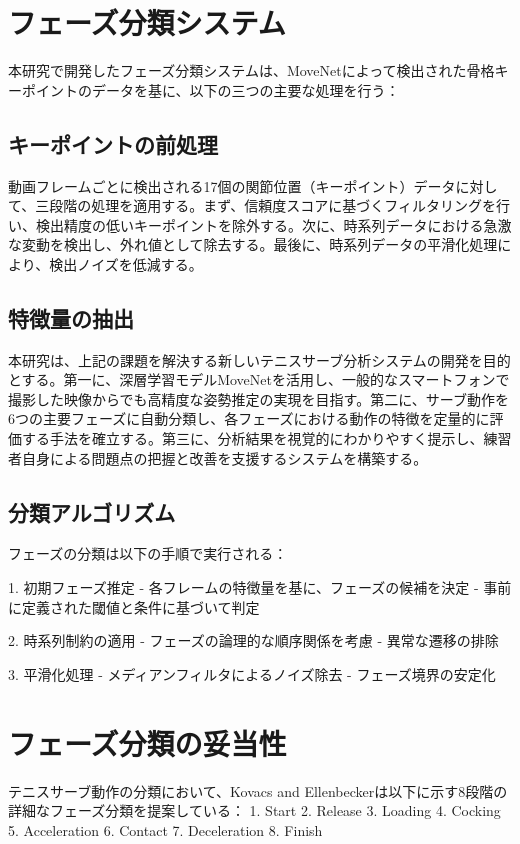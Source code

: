 \documentclass[oneside]{suribt}[11pt]
\begin{document}
\section{フェーズ分類システム}
本研究で開発したフェーズ分類システムは、MoveNetによって検出された骨格キーポイントのデータを基に、以下の三つの主要な処理を行う：

\subsection{キーポイントの前処理}
動画フレームごとに検出される17個の関節位置（キーポイント）データに対して、三段階の処理を適用する。まず、信頼度スコアに基づくフィルタリングを行い、検出精度の低いキーポイントを除外する。次に、時系列データにおける急激な変動を検出し、外れ値として除去する。最後に、時系列データの平滑化処理により、検出ノイズを低減する。

\subsection{特徴量の抽出}
本研究は、上記の課題を解決する新しいテニスサーブ分析システムの開発を目的とする。第一に、深層学習モデルMoveNetを活用し、一般的なスマートフォンで撮影した映像からでも高精度な姿勢推定の実現を目指す。第二に、サーブ動作を6つの主要フェーズに自動分類し、各フェーズにおける動作の特徴を定量的に評価する手法を確立する。第三に、分析結果を視覚的にわかりやすく提示し、練習者自身による問題点の把握と改善を支援するシステムを構築する。

\subsection{分類アルゴリズム}
フェーズの分類は以下の手順で実行される：

1. 初期フェーズ推定
   - 各フレームの特徴量を基に、フェーズの候補を決定
   - 事前に定義された閾値と条件に基づいて判定

2. 時系列制約の適用
   - フェーズの論理的な順序関係を考慮
   - 異常な遷移の排除

3. 平滑化処理
   - メディアンフィルタによるノイズ除去
   - フェーズ境界の安定化

\section{フェーズ分類の妥当性}
テニスサーブ動作の分類において、Kovacs and Ellenbecker\cite{kovacs2011}は以下に示す8段階の詳細なフェーズ分類を提案している：
1. Start
2. Release
3. Loading
4. Cocking
5. Acceleration
6. Contact
7. Deceleration
8. Finish
\end{document}
